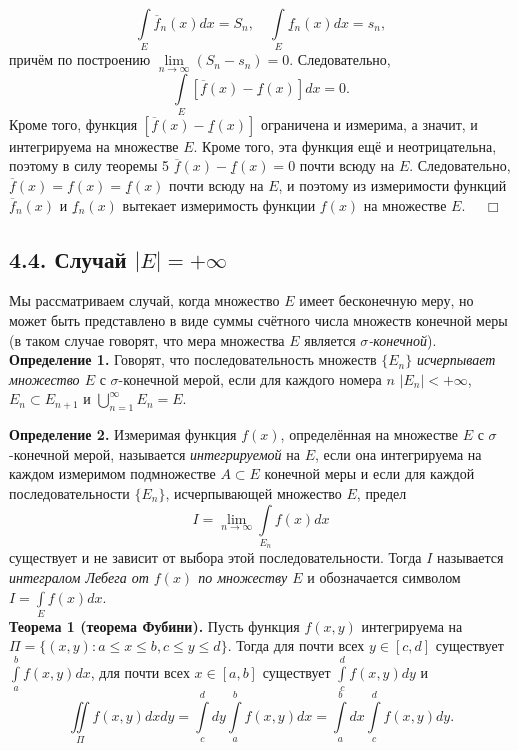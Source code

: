 \documentclass[12pt,a4paper, titlepage]{article}
\begin{document}
$$
\int\limits_E \overline{f}{}_n(x) dx = S_n, \quad \int\limits_E \underline{f}{}_n(x) dx = s_n,
$$
причём по построению $\lim\limits_{n\to\infty} (S_n - s_n) = 0$. Следовательно,
$$
\int\limits_E [\overline{f}(x) - \underline{f}(x)] dx = 0.
$$
Кроме того, функция $[\overline{f}(x) - \underline{f}(x)]$ ограничена и измерима, а значит, и интегрируема на множестве $E$. Кроме того, эта функция ещё и неотрицательна, поэтому в силу теоремы 5 $\overline{f}(x) - \underline{f}(x) = 0$ почти всюду на $E$. Следовательно, $\overline{f}(x) = f(x) = \underline{f}(x)$ почти всюду на $E$, и поэтому из измеримости функций $\overline{f}{}_n(x)$ и $\underline{f}{}_n(x)$ вытекает измеримость функции $f(x)$ на множестве $E$. $\quad \Box$\\


\subsection*{4.4. Случай $|E| = +\infty$}

Мы рассматриваем случай, когда множество $E$ имеет бесконечную меру, но может быть представлено в виде суммы счётного числа множеств конечной меры (в таком случае говорят, что мера множества $E$ является \textit{$\sigma$-конечной}).\\

\textbf{Определение 1.} Говорят, что последовательность множеств $\lbrace E_n \rbrace$ \textit{исчерпывает множество $E$} с $\sigma$-конечной мерой, если для каждого номера $n$ $|E_n| < + \infty$, $E_n \subset E_{n+1}$ и $\bigcup\limits_{n=1}^\infty E_n = E$.

\textbf{Определение 2.} Измеримая функция $f(x)$, определённая на множестве $E$ с $\sigma$-конечной мерой, называется \textit{интегрируемой} на $E$, если она интегрируема на каждом измеримом подмножестве $A \subset E$ конечной меры и если для каждой последовательности $\lbrace E_n \rbrace$, исчерпывающей множество $E$, предел
$$
I = \lim_{n\to\infty} \int\limits_{E_n} f(x) dx
$$
существует и не зависит от выбора этой последовательности. Тогда $I$ называется \textit{интегралом Лебега от $f(x)$ по множеству $E$} и обозначается символом $I = \int\limits_E f(x) dx$.\\

\textbf{Теорема 1 (теорема Фубини).} Пусть функция $f(x, y)$ интегрируема на $\Pi = \lbrace (x, y): a \leqslant x \leqslant b, c \leqslant y \leqslant d \rbrace$. Тогда для почти всех $y \in [c, d]$ существует $\int\limits_a^b f(x, y) dx$, для почти всех $x \in [a,b]$ существует $\int\limits_c^d f(x, y) dy$ и
$$
\iint\limits_\Pi f(x, y) dx dy = \int\limits_c^d dy \int\limits_a^b f(x, y) dx = \int\limits_a^b dx \int\limits_c^d f(x, y) dy.
$$
\end{document}
